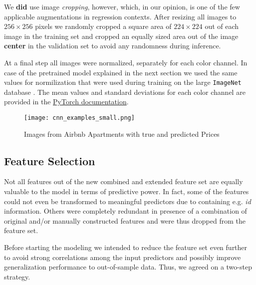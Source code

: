 We \textbf{did} use image \emph{cropping}, however, which, in our opinion, is one of the few applicable augmentations in regression contexts.
After resizing all images to $256 \times 256$ pixels we randomly cropped a square area of $224 \times 224$ out of each image in the training set and cropped an equally sized area out of the image \textbf{center} in the validation set to avoid any randomness during inference.

At a final step all images were normalized, separately for each color channel.
In case of the pretrained model explained in the next section we used the same values for normilization that were used during training on the large \texttt{ImageNet} database \citep{russakovsky2015}.
The mean values and standard deviations for each color channel are provided in the \href{https://pytorch.org/vision/stable/models.html}{PyTorch documentation}.

\begin{figure}[t]
    \centering
    \texttt{[image: cnn\_examples\_small.png]}
    \caption{Images from Airbnb Apartments with true and predicted Prices}
    \label{fig:cnn-examples}
\end{figure}

\subsection{Feature Selection} \label{appendix:feature-selection}

Not all features out of the new combined and extended feature set are equally valuable to the model in terms of predictive power.
In fact, some of the features could not even be transformed to meaningful predictors due to containing e.g. \emph{id} information.
Others were completely redundant in presence of a combination of original and/or manually constructed features and were thus dropped from the feature set.

Before starting the modeling we intended to reduce the feature set even further to avoid strong correlations among the input predictors and possibly improve generalization performance to out-of-sample data.
Thus, we agreed on a two-step strategy.


